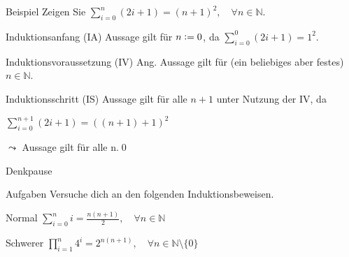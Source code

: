 \begin{frame}[fragile]{Beispiel}
Zeigen Sie $\displaystyle\sum_{i = 0}^{n} (2i+1) = (n+1)^2, \quad\forall n \in\mathbb{N}$.
\begin{alertblock}{Induktionsanfang (IA)}
    Aussage gilt für $n\vcentcolon=0$, da $\displaystyle\sum_{i = 0}^{0} (2i+1) = 1^2$.
\end{alertblock}
\begin{alertblock}{Induktionsvoraussetzung (IV)}
    Ang. Aussage gilt für (ein beliebiges aber festes) $n \in\mathbb{N}$.
\end{alertblock}
\begin{alertblock}{Induktionsschritt (IS)}
    Aussage gilt für alle $n+1$ unter Nutzung der IV, da\par
    $\displaystyle\sum_{i = 0}^{n+1} (2i+1) = ((n+1)+1)^2$
\end{alertblock}
\alert{$\leadsto$ Aussage gilt für alle n.}\qed
\end{frame}


{
\begin{frame}[fragile]{Denkpause}
    \begin{alertblock}{Aufgaben}
    Versuche dich an den folgenden Induktionsbeweisen.
    \end{alertblock}

    \begin{block}{Normal}
        $\displaystyle\sum_{i=0}^{n} i = \frac{n(n+1)}{2}, \quad \forall n \in \mathbb{N}$
    \end{block}
    \begin{block}{Schwerer}
        $\displaystyle\prod_{i=1}^{n} 4^i = 2^{n(n+1)}, \quad \forall n \in \mathbb{N}\setminus \{0\}$
    \end{block}
\end{frame}
}

